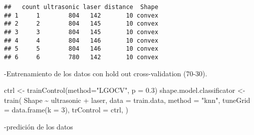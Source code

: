 \documentclass[
]{article}
\newenvironment{Shaded}{\begin{snugshade}}{\end{snugshade}}
\newcommand{\AttributeTok}[1]{\textcolor[rgb]{0.77,0.63,0.00}{#1}}
\newcommand{\ConstantTok}[1]{\textcolor[rgb]{0.00,0.00,0.00}{#1}}
\newcommand{\DecValTok}[1]{\textcolor[rgb]{0.00,0.00,0.81}{#1}}
\newcommand{\FloatTok}[1]{\textcolor[rgb]{0.00,0.00,0.81}{#1}}
\newcommand{\FunctionTok}[1]{\textcolor[rgb]{0.00,0.00,0.00}{#1}}
\newcommand{\NormalTok}[1]{#1}
\newcommand{\OtherTok}[1]{\textcolor[rgb]{0.56,0.35,0.01}{#1}}
\newcommand{\SpecialCharTok}[1]{\textcolor[rgb]{0.00,0.00,0.00}{#1}}
\newcommand{\StringTok}[1]{\textcolor[rgb]{0.31,0.60,0.02}{#1}}
\begin{document}
\begin{verbatim}
##   count ultrasonic laser distance  Shape
## 1     1        804   142       10 convex
## 2     2        804   145       10 convex
## 3     3        804   145       10 convex
## 4     4        804   146       10 convex
## 5     5        804   146       10 convex
## 6     6        780   142       10 convex
\end{verbatim}

\begin{Shaded}
\end{Shaded}

-Entrenamiento de los datos con hold out cross-validation (70-30).

\begin{Shaded}
\begin{Highlighting}[]
\NormalTok{ctrl }\OtherTok{\textless{}{-}} \FunctionTok{trainControl}\NormalTok{(}\AttributeTok{method=}\StringTok{"LGOCV"}\NormalTok{, }\AttributeTok{p =} \FloatTok{0.3}\NormalTok{)}
\NormalTok{    shape.model.classificator }\OtherTok{\textless{}{-}} \FunctionTok{train}\NormalTok{(}
\NormalTok{        Shape }\SpecialCharTok{\textasciitilde{}}\NormalTok{ ultrasonic }\SpecialCharTok{+}\NormalTok{ laser,}
        \AttributeTok{data =}\NormalTok{ train.data,}
        \AttributeTok{method =} \StringTok{"knn"}\NormalTok{,}
        \AttributeTok{tuneGrid =} \FunctionTok{data.frame}\NormalTok{(}\AttributeTok{k =} \DecValTok{3}\NormalTok{),}
        \AttributeTok{trControl =}\NormalTok{ ctrl,}
\NormalTok{    )}
\end{Highlighting}
\end{Shaded}

-predición de los datos

\begin{Shaded}
\end{Shaded}
\end{document}
